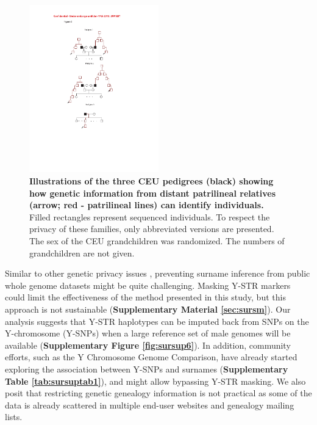 \begin{figure}[h!]
\centering
\label{fig:surfig3}
\includegraphics[width=0.5\textwidth]{Figures/App1/Fig3.pdf}
\caption{\textbf{Illustrations of the three CEU pedigrees (black) showing how genetic information from distant patrilineal relatives (arrow; red - patrilineal lines) can identify individuals.} Filled rectangles represent sequenced individuals. To respect the privacy of these families, only abbreviated versions are presented. The sex of the CEU grandchildren was randomized.  The numbers of grandchildren are not given.}
\end{figure}

Similar to other genetic privacy issues \cite{LinOwenAltman2004,BieberBrennerLazer2006,HomerSzelingerRedmanEtAl2008,JacobsYeagerWacholderEtAl2009,ImGamazonNicolaeEtAl2012,CraigGoorWangEtAl2011,SchadtWooHao2012}, preventing surname inference from public whole genome datasets might be quite challenging. Masking Y-STR markers could limit the effectiveness of the method presented in this study, but this approach is not sustainable (\textbf{Supplementary Material \ref{sec:sursm}}). Our analysis suggests that Y-STR haplotypes can be imputed back from SNPs on the Y-chromosome (Y-SNPs) when a large reference set of male genomes will be available (\textbf{Supplementary Figure \ref{fig:sursup6}}). In addition, community efforts, such as the Y Chromosome Genome Comparison, have already started exploring the association between Y-SNPs and surnames (\textbf{Supplementary Table \ref{tab:sursuptab1}}), and might allow bypassing Y-STR masking. We also posit that restricting genetic genealogy information is not practical as some of the data is already scattered in multiple end-user websites and genealogy mailing lists. 


